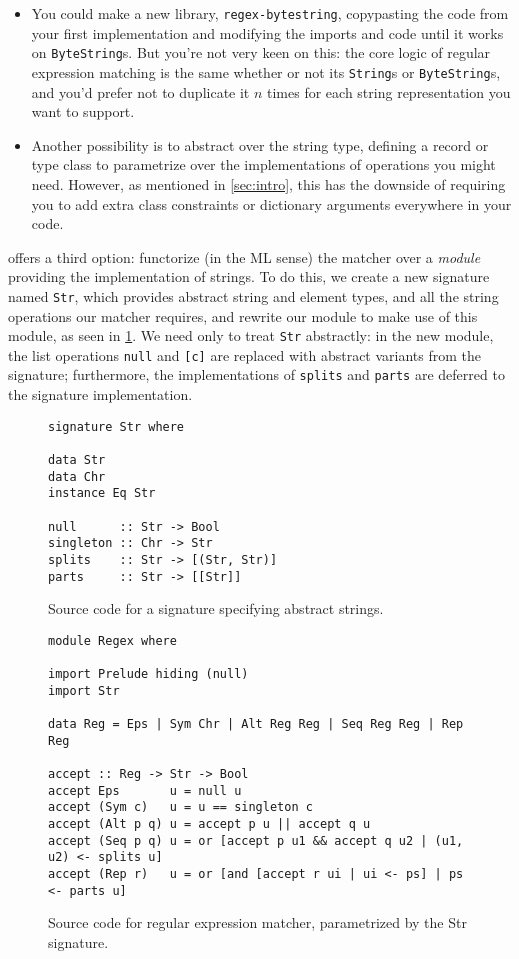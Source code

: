 \begin{itemize}
    \item You could make a new library, \verb|regex-bytestring|,
    copypasting the code from your first implementation and
    modifying the imports and code until it works on \verb|ByteString|s.
    But you're not very keen on this: the core logic of regular expression
    matching is the same whether or not its \verb|String|s or
    \verb|ByteString|s, and you'd prefer not to duplicate it $n$ times
    for each string representation you want to support.

    \item Another possibility is to abstract over the string type,
    defining a record or type class to parametrize over the implementations
    of operations you might need.  However, as mentioned in \cref{sec:intro},
    this has the downside of requiring you to add extra class constraints
    or dictionary arguments everywhere in your code.
\end{itemize}
%
\Backpack{} offers a third option: functorize (in the ML sense) the matcher over a
\emph{module} providing the implementation of strings.  To do this, we
create a new signature named \verb|Str|, which provides abstract string
and element types, and all the string operations our matcher requires,
and rewrite our module to make use of this module, as seen in
\cref{fig:matcher-regex-indef-source}.  We need only to
treat \verb|Str| abstractly: in the new module, the list operations
\verb|null| and \verb|[c]| are replaced with abstract variants from the
signature; furthermore, the implementations of \verb|splits| and
\verb|parts| are deferred to the signature implementation.

\begin{figure}
\begin{lstlisting}
signature Str where

data Str
data Chr
instance Eq Str

null      :: Str -> Bool
singleton :: Chr -> Str
splits    :: Str -> [(Str, Str)]
parts     :: Str -> [[Str]]
\end{lstlisting}
\caption{Source code for a signature specifying abstract strings.}

\begin{lstlisting}
module Regex where

import Prelude hiding (null)
import Str

data Reg = Eps | Sym Chr | Alt Reg Reg | Seq Reg Reg | Rep Reg

accept :: Reg -> Str -> Bool
accept Eps       u = null u
accept (Sym c)   u = u == singleton c
accept (Alt p q) u = accept p u || accept q u
accept (Seq p q) u = or [accept p u1 && accept q u2 | (u1, u2) <- splits u]
accept (Rep r)   u = or [and [accept r ui | ui <- ps] | ps <- parts u]
\end{lstlisting}
\caption{Source code for regular expression matcher, parametrized by the Str signature.}
\label{fig:matcher-regex-indef-source}
\end{figure}

